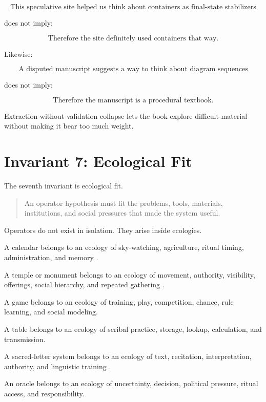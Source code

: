 \documentclass[11pt]{book}
\begin{document}
\[
\text{This speculative site helped us think about containers as final-state stabilizers}
\]

does not imply:

\[
\text{Therefore the site definitely used containers that way}.
\]

Likewise:

\[
\text{A disputed manuscript suggests a way to think about diagram sequences}
\]

does not imply:

\[
\text{Therefore the manuscript is a procedural textbook}.
\]

Extraction without validation collapse lets the book explore difficult material without making it bear too much weight.

\section{Invariant 7: Ecological Fit}

The seventh invariant is ecological fit.

\begin{quote}
An operator hypothesis must fit the problems, tools, materials, institutions, and social pressures that made the system useful.
\end{quote}

Operators do not exist in isolation. They arise inside ecologies.

A calendar belongs to an ecology of sky-watching, agriculture, ritual timing, administration, and memory \cite{Neugebauer1957ExactSciences,Aveni1989EmpiresTime,Parker1950CalendarsEgypt,Needham1959ScienceCivilisationChina3}.

A temple or monument belongs to an ecology of movement, authority, visibility, offerings, social hierarchy, and repeated gathering \cite{Ruggles1999AstronomyPrehistoricBritain,Ruggles2005AncientAstronomy,Krupp1994EchoesAncientSkies}.

A game belongs to an ecology of training, play, competition, chance, rule learning, and social modeling.

A table belongs to an ecology of scribal practice, storage, lookup, calculation, and transmission.

A sacred-letter system belongs to an ecology of text, recitation, interpretation, authority, and linguistic training \cite{Eco1995SearchPerfectLanguage,Scholem1974Kabbalah,Idel1988KabbalahNewPerspectives,Yates1966ArtMemory}.

An oracle belongs to an ecology of uncertainty, decision, political pressure, ritual access, and responsibility.
\end{document}
